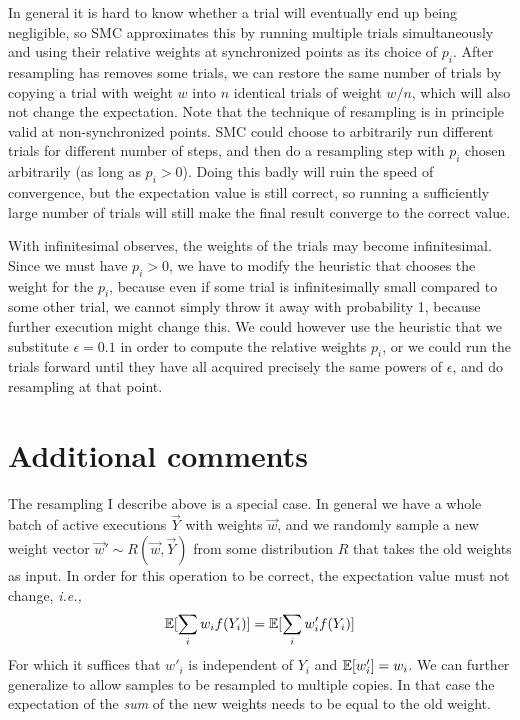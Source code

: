 \documentclass[a4paper, 11pt]{article}
\theoremstyle{definition}
\newcommand{\ie}{\textit{i.e.,}\xspace}
\begin{document}
In general it is hard to know whether a trial will eventually end up being negligible, so SMC approximates this by running multiple trials simultaneously and using their relative weights at synchronized points as its choice of $p_i$. After resampling has removes some trials, we can restore the same number of trials by copying a trial with weight $w$ into $n$ identical trials of weight $w/n$, which will also not change the expectation. Note that the technique of resampling is in principle valid at non-synchronized points. SMC could choose to arbitrarily run different trials for different number of steps, and then do a resampling step with $p_i$ chosen arbitrarily (as long as $p_i > 0$). Doing this badly will ruin the speed of convergence, but the expectation value is still correct, so running a sufficiently large number of trials will still make the final result converge to the correct value.

With infinitesimal observes, the weights of the trials may become infinitesimal. Since we must have $p_i > 0$, we have to modify the heuristic that chooses the weight for the $p_i$, because even if some trial is infinitesimally small compared to some other trial, we cannot simply throw it away with probability 1, because further execution might change this. We could however use the heuristic that we substitute $\epsilon = 0.1$ in order to compute the relative weights $p_i$, or we could run the trials forward until they have all acquired precisely the same powers of $\epsilon$, and do resampling at that point.

\section*{Additional comments}

The resampling I describe above is a special case. In general we have a whole batch of active executions $\vec{Y}$ with weights $\vec{w}$, and we randomly sample a new weight vector $\vec{w}' \sim R(\vec{w},\vec{Y})$ from some distribution $R$ that takes the old weights as input. In order for this operation to be correct, the expectation value must not change, \ie
\begin{align}
  \mathbb{E}[\sum_i w_i f(Y_i)] = \mathbb{E}[\sum_i w'_i f(Y_i)]
\end{align}
For which it suffices that $w'_i$ is independent of $Y_i$ and $\mathbb{E}[w'_i] = w_i$. We can further generalize to allow samples to be resampled to multiple copies. In that case the expectation of the \emph{sum} of the new weights needs to be equal to the old weight.
\end{document}
